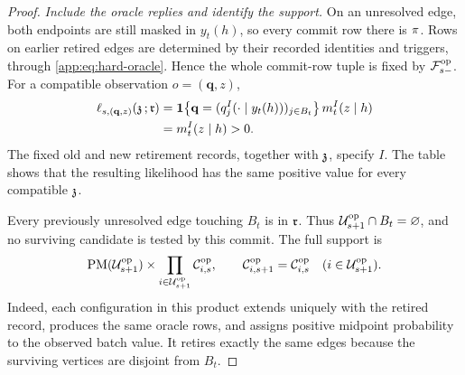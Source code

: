 \begin{proof}
\emph{Include the oracle replies and identify the support.}
On an unresolved edge, both endpoints are still masked in \(y_t(h)\),
so every commit row there is \(\HardMarginal\).
Rows on earlier retired edges are determined by their recorded identities
and triggers, through \eqref{app:eq:hard-oracle}.
Hence the whole commit-row tuple is fixed by \(\OpAnalyticField{s}\).
For a compatible observation \(o=(\mathbf q,z)\),
\begin{align*}
 \OpSurvivorLikelihood{s}{(\mathbf q,z)}{\SurvivorConfigA}{\RetiredRecordValue}
 &=\mathbf 1\!\left\{
      \mathbf q=(\HardOracleRow{I}{y_t(h)}{j})_{j\in B_t}
    \right\}
    \HardMidpointKernel{t}{I}(z\mid h)\\
 &=\HardMidpointKernel{t}{I}(z\mid h)>0.
\end{align*}
The fixed old and new retirement records, together with
\(\SurvivorConfigA\), specify \(I\). The table shows that the resulting
likelihood has the same positive value for every compatible
\(\SurvivorConfigA\).

Every previously unresolved edge touching \(B_t\) is in
\(\RetiredRecordValue\). Thus
\(\OpUnresolvedVertices{s+1}\cap B_t=\varnothing\), and no surviving
candidate is tested by this commit. The full support is
\[
 \operatorname{PM}(\OpUnresolvedVertices{s+1})
 \times\prod_{i\in\OpUnresolvedVertices{s+1}}\OpRemainingTriggers{i}{s},
 \qquad
 \OpRemainingTriggers{i}{s+1}=\OpRemainingTriggers{i}{s}
 \quad(i\in\OpUnresolvedVertices{s+1}).
\]
Indeed, each configuration in this product extends uniquely with the
retired record, produces the same oracle rows, and assigns positive
midpoint probability to the observed batch value.
It retires exactly the same edges because the surviving vertices
are disjoint from \(B_t\).


\end{proof}
